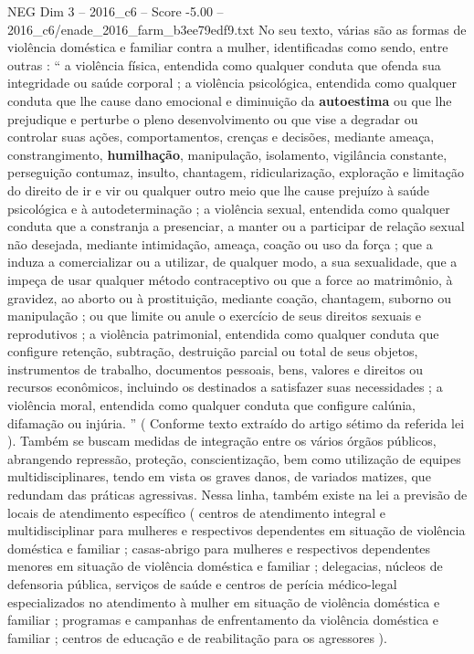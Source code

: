 \begin{textsample}{NEG Dim 3 – 2016\_c6 – Score -5.00 – 2016\_c6/enade\_2016\_farm\_b3ee79edf9.txt}
No seu texto, várias são as formas de violência doméstica e familiar contra a mulher, identificadas como sendo, entre outras : “ a violência física, entendida como qualquer conduta que ofenda sua integridade ou saúde corporal ; a violência psicológica, entendida como qualquer conduta que lhe cause dano emocional e diminuição da \textbf{autoestima} ou que lhe prejudique e perturbe o pleno desenvolvimento ou que vise a degradar ou controlar suas ações, comportamentos, crenças e decisões, mediante ameaça, constrangimento, \textbf{humilhação}, manipulação, isolamento, vigilância constante, perseguição contumaz, insulto, chantagem, ridicularização, exploração e limitação do direito de ir e vir ou qualquer outro meio que lhe cause prejuízo à saúde psicológica e à autodeterminação ; a violência sexual, entendida como qualquer conduta que a constranja a presenciar, a manter ou a participar de relação sexual não desejada, mediante intimidação, ameaça, coação ou uso da força ; que a induza a comercializar ou a utilizar, de qualquer modo, a sua sexualidade, que a impeça de usar qualquer método contraceptivo ou que a force ao matrimônio, à gravidez, ao aborto ou à prostituição, mediante coação, chantagem, suborno ou manipulação ; ou que limite ou anule o exercício de seus direitos sexuais e reprodutivos ; a violência patrimonial, entendida como qualquer conduta que configure retenção, subtração, destruição parcial ou total de seus objetos, instrumentos de trabalho, documentos pessoais, bens, valores e direitos ou recursos econômicos, incluindo os destinados a satisfazer suas necessidades ; a violência moral, entendida como qualquer conduta que configure calúnia, difamação ou injúria. ” ( Conforme texto extraído do artigo sétimo da referida lei ).
Também se buscam medidas de integração entre os vários órgãos públicos, abrangendo repressão, proteção, conscientização, bem como utilização de equipes multidisciplinares, tendo em vista os graves danos, de variados matizes, que redundam das práticas agressivas.
Nessa linha, também existe na lei a previsão de locais de atendimento específico ( centros de atendimento integral e multidisciplinar para mulheres e respectivos dependentes em situação de violência doméstica e familiar ; casas-abrigo para mulheres e respectivos dependentes menores em situação de violência doméstica e familiar ; delegacias, núcleos de defensoria pública, serviços de saúde e centros de perícia médico-legal especializados no atendimento à mulher em situação de violência doméstica e familiar ; programas e campanhas de enfrentamento da violência doméstica e familiar ; centros de educação e de reabilitação para os agressores ).

\end{textsample}
